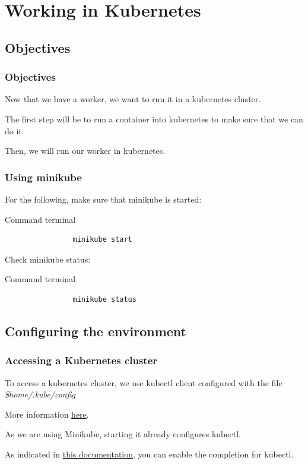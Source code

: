 \section{Working in Kubernetes}

\subsection{Objectives}
	\begin{frame}
		\frametitle{Objectives}
		Now that we have a worker, we want to run it in a kubernetes cluster.
		
		\bigskip
		The first step will be to run a container into kubernetes to make sure that we can do it.
		
		\bigskip
		Then, we will run our worker in kubernetes.	
	\end{frame}
	
	\begin{frame}[fragile]
		\frametitle{Using minikube}
	
		For the following, make sure that minikube is started:
		\begin{block}{Command terminal}
			\begin{verbatim}
				minikube start
			\end{verbatim}
		\end{block}
	
		Check minikube status:
		\begin{block}{Command terminal}
			\begin{verbatim}
				minikube status
			\end{verbatim}
		\end{block}
	\end{frame}
	
\subsection{Configuring the environment}
	
	\begin{frame}
		\frametitle{Accessing a Kubernetes cluster}
		
		To access a kubernetes cluster, we use kubectl client configured with the file \textit{ \$home/.kube/config}
		
		More information \href{https://kubernetes.io/docs/tasks/access-application-cluster/configure-access-multiple-clusters/}{here}.
		
		\bigskip
		
		As we are using Minikube, starting it already configures kubectl.
		
		\bigskip
		
		As indicated in \href{https://kubernetes.io/docs/tasks/tools/install-kubectl/\#enabling-shell-autocompletion}{this documentation}, you can enable the completion for kubectl.
		
	\end{frame}
	

